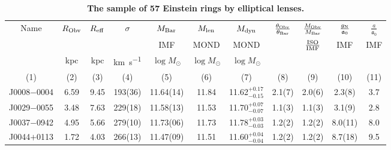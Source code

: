 \documentclass[fleqn,usenatbib,useAMS]{mnras}
\begin{document}
    \begin{table*}
    \centering
    \tabcolsep=4pt
    \setlength{\extrarowheight}{3pt}
    \caption[\textbf{The sample of 57 Einstein rings by elliptical lenses.}]{\textbf{The sample of 57 Einstein rings by elliptical lenses.}}\label{tab:data}
        \begin{tabular}{
        c
        S[table-figures-integer=1,table-figures-decimal=2]
        S[table-figures-integer=2,table-figures-decimal=2]
        S[table-figures-decimal=0,separate-uncertainty,table-figures-uncertainty=1]
        S[separate-uncertainty,table-figures-uncertainty=1]
        S[table-figures-integer=2,table-figures-decimal=2]
        c
        S[table-figures-decimal=1,separate-uncertainty,table-figures-uncertainty=1]
        S[table-figures-decimal=1,separate-uncertainty,table-figures-uncertainty=1]
        S[table-figures-decimal=1,separate-uncertainty,table-figures-uncertainty=1]
        S[table-figures-integer=1,table-figures-decimal=1]
        }
        \hline
        {Name} & {$R_{\rm Obv}$} & {$R_{\rm eff}$} & {$\sigma$} & {$M_{\rm Bar}$} & {$M_{\rm len}$} & {$M_{\rm dyn}$} &	 {$\frac{\theta_{\rm Obv}}{\theta_{\rm Bar}}$} & {$\frac{M_{\rm Obv}}{M_{\rm Bar}}$} & {$\frac{g_{\rm N}}{\mathfrak{a}_0}$} & {$\frac{a}{\mathfrak{a}_0}$} \\
         & & &	& {\footnotesize{IMF}} & {\footnotesize{MOND}} & {\footnotesize{MOND}} & & {\footnotesize{$\frac{\rm ISO}{\rm IMF}$}} & {\footnotesize{IMF}} & {\footnotesize{IMF}} \\
         &	{kpc} &{kpc} & {\si{\kilo\metre\per\second}} & {\footnotesize{$\log{M}_{\odot}$}} & {\footnotesize{$\log{M}_{\odot}$}} & {\footnotesize{$\log{M}_{\odot}$}} & & & & \\
        {(1)} & {(2)} & {(3)} & {(4)} &{(5)} & {(6)} & {(7)} & {(8)} & {(9)} & {(10)} & {(11)}  \\						  				
        \hline																																																																																 J0008$-$0004& 6.59 & 9.45 & 193(36) & 11.64(14) & 11.84 & 11.62$^{+0.17}_{-0.15}$ & 2.1(7) & 2.0(6) & 2.3(8) & 3.7 \\
        J0029$-$0055& 3.48 & 7.63 & 229(18) & 11.58(13) & 11.53 & 11.70$^{+0.07}_{-0.07}$ & 1.1(3) & 1.1(3) & 3.1(9) & 2.8 \\
        J0037$-$0942& 4.95 & 5.66 & 279(10) & 11.73(06) & 11.73 & 11.78$^{+0.03}_{-0.03}$ & 1.2(2) & 1.2(2) & 8.0(11) & 8.0 \\
        J0044$+$0113& 1.72 & 4.03 & 266(13) & 11.47(09) & 11.51 & 11.60$^{+0.04}_{-0.04}$ & 1.2(2) & 1.2(2) & 8.7(18) & 9.5 \\

\end{tabular}
\end{table*}
\end{document}
